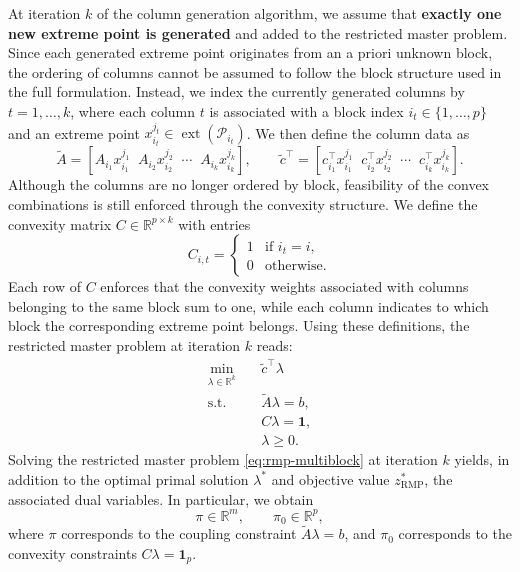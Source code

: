 \documentclass{book}
\theoremstyle{definition}
\newcounter{algorithm_}
\numberwithin{algorithm_}{chapter}
\begin{document}
At iteration $k$ of the column generation algorithm, we assume that \textbf{exactly one new extreme point is generated} and added to the restricted master problem. Since each generated extreme point originates from an a priori unknown block, the ordering of columns cannot be assumed to follow the block structure used in the full formulation. Instead, we index the currently generated columns by $t = 1,\dots,k$, where each column $t$ is associated with a block index $i_t \in \{1,\dots,p\}$ and an extreme point $x_{i_t}^{j_t} \in \operatorname{ext}(\mathcal{P}_{i_t})$. We then define the column data as
\[
\tilde{A} = \left[ A_{i_1} x_{i_1}^{j_1} \;\; A_{i_2} x_{i_2}^{j_2} \;\; \cdots \;\; A_{i_k} x_{i_k}^{j_k} \right],
\qquad
\tilde{c}^\top =
\left[ c_{i_1}^\top x_{i_1}^{j_1} \;\; c_{i_2}^\top x_{i_2}^{j_2} \;\; \cdots \;\; c_{i_k}^\top x_{i_k}^{j_k} \right].
\]
Although the columns are no longer ordered by block, feasibility of the convex combinations is still enforced through the convexity structure. We define the convexity matrix $C \in \mathbb{R}^{p \times k}$ with entries
\[
C_{i,t} =
\begin{cases}
1 & \text{if } i_t = i, \\
0 & \text{otherwise}.
\end{cases}
\]
Each row of $C$ enforces that the convexity weights associated with columns belonging to the same block sum to one, while each column indicates to which block the corresponding extreme point belongs.
Using these definitions, the restricted master problem at iteration $k$ reads:
\begin{subequations}\label{eq:rmp-multiblock}
\begin{align}
\min_{\lambda \in \mathbb{R}^k} \quad 
& \tilde{c}^\top \lambda \\[4pt]
\text{s.t.} \quad 
& \tilde{A} \lambda = b, \\[6pt]
& C \lambda = \mathbf{1}, \\[4pt]
& \lambda \ge 0.
\end{align}
\end{subequations}
Solving the restricted master problem \eqref{eq:rmp-multiblock} at iteration $k$ yields, in addition to the optimal primal solution $\lambda^*$ and objective value $z_{\mathrm{RMP}}^*$, the associated dual variables. In particular, we obtain
\begin{equation}
\pi \in \mathbb{R}^m, \qquad \pi_0 \in \mathbb{R}^p,
\end{equation}
where $\pi$ corresponds to the coupling constraint $\tilde{A}\lambda = b$, and $\pi_0$ corresponds to the convexity constraints $C\lambda = \mathbf{1}_p$.
\end{document}

